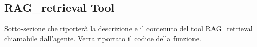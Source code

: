 \subsection{RAG\_retrieval Tool}

Sotto-sezione che riporterà la descrizione e il contenuto del tool RAG\_retrieval chiamabile dall'agente.
Verra riportato il codice della funzione.
